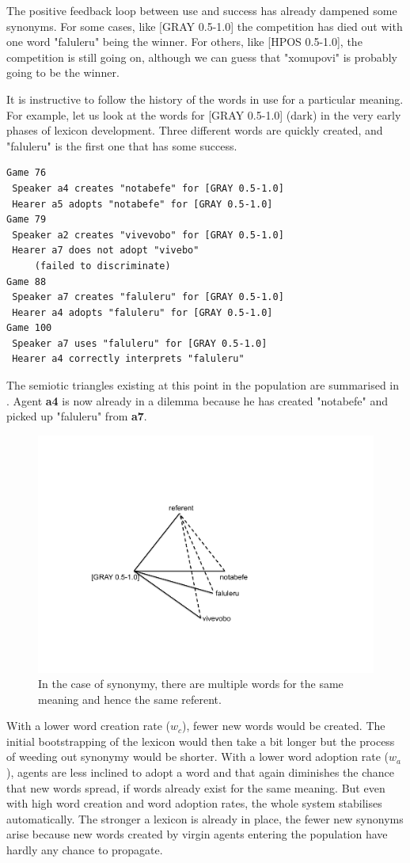 The positive feedback loop between use and success
has already dampened some synonyms. For some cases, like [GRAY 0.5-1.0] the competition has died out 
with one word "faluleru" being the winner. 
For others, like [HPOS 0.5-1.0], the competition 
is still going on, although we can guess
that "xomupovi" is probably going to be the winner. 

It is instructive to follow the history of the words 
in use for a particular meaning. For 
example, let us look at the words for [GRAY 0.5-1.0] 
(dark) in the very early phases of lexicon development.
Three different words are quickly created, and 
"faluleru" is the first one that has some success. 
\begin{verbatim}
Game 76
 Speaker a4 creates "notabefe" for [GRAY 0.5-1.0]
 Hearer a5 adopts "notabefe" for [GRAY 0.5-1.0]
Game 79 
 Speaker a2 creates "vivevobo" for [GRAY 0.5-1.0]
 Hearer a7 does not adopt "vivebo" 
     (failed to discriminate)
Game 88 
 Speaker a7 creates "faluleru" for [GRAY 0.5-1.0]
 Hearer a4 adopts "faluleru" for [GRAY 0.5-1.0]
Game 100 
 Speaker a7 uses "faluleru" for [GRAY 0.5-1.0]
 Hearer a4 correctly interprets "faluleru"
\end{verbatim}
The semiotic triangles existing at this point in the population are 
summarised in . 
Agent {\bf a4} is now already in a dilemma because he has created
"notabefe" and picked up "faluleru" from {\bf a7}. 
\begin{figure}[htbp]
  \centerline{\includegraphics[width=.50\textwidth]{chap6/figs/triangle6}}
\caption{\label{triangle6} In the case of synonymy, 
there are multiple words for the same meaning and hence the 
same referent.}
\end{figure}

With a lower word creation rate ($w_{c}$), 
fewer new words would be created. The initial bootstrapping
of the lexicon would then take a bit longer but the 
process of weeding out synonymy would be shorter. 
With a lower word adoption rate ($w_{a}$), agents are
less inclined to adopt a word and that again diminishes
the chance that new words spread, if words already 
exist for the same meaning. But even with high word creation
and word adoption rates, the whole system stabilises automatically. 
The stronger a lexicon is already in place, the fewer
new synonyms arise because new words
created by virgin agents entering the population have hardly 
any chance to propagate. 

